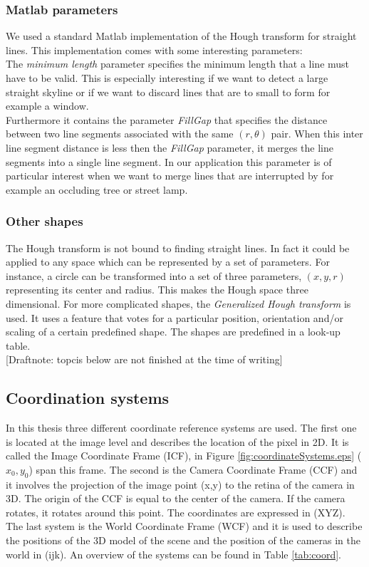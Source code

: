 \subsubsection{Matlab parameters}
We used a standard Matlab implementation of the Hough transform for straight lines.  This implementation comes with some interesting parameters:\\

	The \emph{minimum length} parameter specifies the minimum length that a line must have to be valid. This is especially interesting if we want to detect a large straight skyline or if we want to discard lines that are to small to form for example a window.\\

	Furthermore it contains the parameter \emph{FillGap} that specifies the distance
	between two line segments associated with the same $(r, \theta)$ pair.
	When this inter line segment distance is less then the \emph{FillGap} parameter, it merges the line segments into a single line segment. In our application this parameter is of particular interest when we want to merge lines that are interrupted by for example an occluding tree or street lamp.\\


\subsubsection{Other shapes}
The Hough transform is not bound to finding straight lines. In fact it could be
applied to any space which can be represented by a set of parameters.  For
instance, a circle can be transformed into a set of three parameters, $(x,y,r)$
representing its center and radius. This makes the Hough space three
dimensional.  For more complicated shapes, the 
\emph{Generalized Hough transform} is used.
It uses a feature that votes for a particular position, orientation and/or scaling of a certain predefined shape.  The shapes are predefined in a look-up table.\\

[Draftnote: topcis below are not finished at the time of writing]

\subsection{Coordination systems}
In this thesis three different coordinate reference systems are used. 
The first one is located at the image level and describes the
location of the pixel in 2D. It is called the Image Coordinate Frame (ICF), in
Figure \ref{fig:coordinateSystems.eps} ($x_0,y_0$) span this frame.
The second is the Camera Coordinate
Frame (CCF) and it involves the projection of the image point (x,y) to the
retina of the camera in 3D.  The origin of the CCF is equal to the center of the
camera. If the camera rotates, it rotates around this point. The coordinates are
expressed in (XYZ). \\
The last system is the World Coordinate Frame (WCF) and it is used to describe the positions of the 3D model of the
scene and the position of the cameras in the world in (ijk). An overview of the
systems can be found in Table \ref{tab:coord}.

